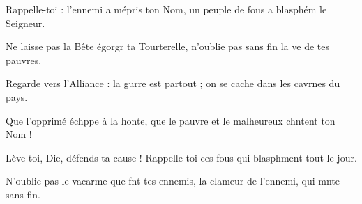 \item Rappelle-toi : l’ennemi a mépris ton Nom, un peuple de fous a blasphém le Seigneur.
\item Ne laisse pas la Bête égorgr ta Tourterelle, n’oublie pas sans fin la ve de tes pauvres.
\item Regarde vers l’Alliance : la gurre est partout ; on se cache dans les cavrnes du pays.
\item Que l’opprimé échppe à la honte, que le pauvre et le malheureux chntent ton Nom !
\item Lève-toi, Die, défends ta cause ! Rappelle-toi ces fous qui blasphment tout le jour.
\item N’oublie pas le vacarme que fnt tes ennemis, la clameur de l’ennemi, qui mnte sans fin.